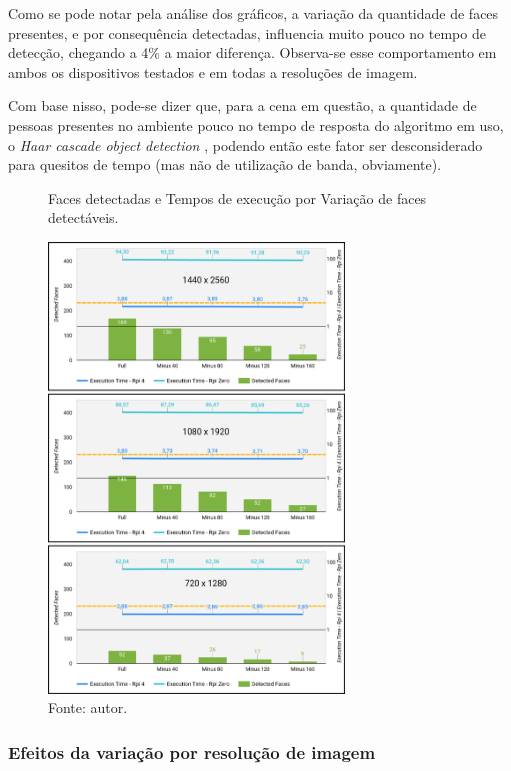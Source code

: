 Como se pode notar pela análise dos gráficos, a variação da quantidade de faces presentes, e por consequência detectadas, influencia muito pouco no tempo de detecção, chegando a 4\% a maior diferença. Observa-se esse comportamento em ambos os dispositivos testados e em todas a resoluções de imagem.

Com base nisso, pode-se dizer que, para a cena em questão, a quantidade de pessoas presentes no ambiente pouco no tempo de resposta do algoritmo em uso, o \textit{Haar cascade object detection} \cite{Viola2001}, podendo então este fator ser desconsiderado para quesitos de tempo (mas não de utilização de banda, obviamente).

\begin{figure}[H]
    \centering
    \caption[Faces detectadas e Tempos de execução por Variação de faces detectáveis.]{Faces detectadas e Tempos de execução por Variação de faces detectáveis.}
    \includegraphics[width=0.7\textwidth]{Cap4_Experimentos_Realizados/Figures/cena1_graficos_variacao_faces.jpg}
    \caption*{Fonte: autor.}
    \label{fig:dadosCena1_graficos_variacao_faces}
\end{figure}

\subsubsection{Efeitos da variação por resolução de imagem}

